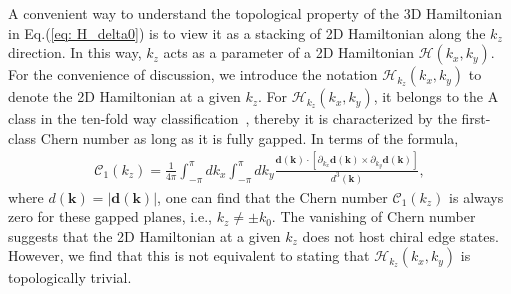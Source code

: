 \documentclass[aps,prl,twocolumn,longbibliography]{revtex4-1}
\newcommand{\bk}{\boldsymbol k}
\newcommand{\bd}{\boldsymbol d}
\begin{document}
\begin{widetext}
A convenient way to understand the topological property of the 3D Hamiltonian in Eq.(\ref{eq: H_delta0}) is to view it as
a stacking of 2D Hamiltonian along the $k_{z}$ direction. In this way, $k_{z}$ acts as a parameter of a 2D Hamiltonian
$\mathcal{H}(k_{x},k_{y})$. For the convenience of discussion, we introduce the notation
$\mathcal{H}_{k_{z}}(k_{x},k_{y})$ to denote the 2D Hamiltonian at a given $k_{z}$.
For $\mathcal{H}_{k_{z}}(k_{x},k_{y})$,  it belongs to the A class in the ten-fold way classification~\cite{Schnyder2008,kitaev2009periodic}, thereby it is characterized by the first-class Chern number as long as it is fully gapped.  In terms
of the formula,
\begin{eqnarray}
\mathcal{C}_{1}(k_{z})=\frac{1}{4\pi}\int_{-\pi}^{\pi}dk_{x}\int_{-\pi}^{\pi}dk_{y}
\frac{\bd(\bk)\cdot[\partial_{k_{x}}\bd(\bk)\times\partial_{k_{y}}\bd(\bk)]}{d^{3}(\bk)},
\end{eqnarray}
where $d(\bk)=|\bd(\bk)|$, one can find that the Chern number $\mathcal{C}_{1}(k_{z})$ is always zero for these gapped
planes, i.e., $k_{z}\neq \pm k_{0}$. The vanishing of Chern number suggests that the 2D Hamiltonian at a given
$k_{z}$ does not host chiral edge states. However, we find that this is not equivalent to stating that
$\mathcal{H}_{k_{z}}(k_{x},k_{y})$ is topologically trivial.


\end{widetext}
\end{document}
